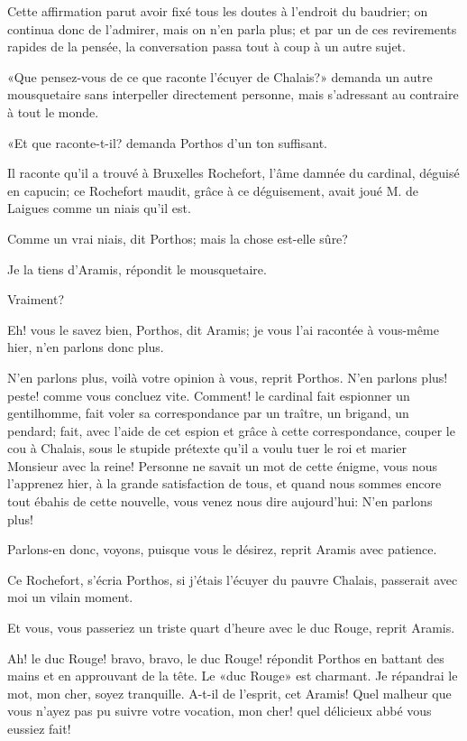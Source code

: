 Cette affirmation parut avoir fixé tous les doutes à l'endroit du baudrier; on continua donc de l'admirer, mais on n'en parla plus; et par un de ces revirements rapides de la pensée, la conversation passa tout à coup à un autre sujet. 

«Que pensez-vous de ce que raconte l'écuyer de Chalais?» demanda un autre mousquetaire sans interpeller directement personne, mais s'adressant au contraire à tout le monde. 

«Et que raconte-t-il? demanda Porthos d'un ton suffisant. 

\speak  Il raconte qu'il a trouvé à Bruxelles Rochefort, l'âme damnée du cardinal, déguisé en capucin; ce Rochefort maudit, grâce à ce déguisement, avait joué M. de Laigues comme un niais qu'il est. 

\speak  Comme un vrai niais, dit Porthos; mais la chose est-elle sûre? 

\speak  Je la tiens d'Aramis, répondit le mousquetaire. 

\speak  Vraiment? 

\speak  Eh! vous le savez bien, Porthos, dit Aramis; je vous l'ai racontée à vous-même hier, n'en parlons donc plus. 

\speak  N'en parlons plus, voilà votre opinion à vous, reprit Porthos. N'en parlons plus! peste! comme vous concluez vite. Comment! le cardinal fait espionner un gentilhomme, fait voler sa correspondance par un traître, un brigand, un pendard; fait, avec l'aide de cet espion et grâce à cette correspondance, couper le cou à Chalais, sous le stupide prétexte qu'il a voulu tuer le roi et marier Monsieur avec la reine! Personne ne savait un mot de cette énigme, vous nous l'apprenez hier, à la grande satisfaction de tous, et quand nous sommes encore tout ébahis de cette nouvelle, vous venez nous dire aujourd'hui: N'en parlons plus! 

\speak  Parlons-en donc, voyons, puisque vous le désirez, reprit Aramis avec patience. 

\speak  Ce Rochefort, s'écria Porthos, si j'étais l'écuyer du pauvre Chalais, passerait avec moi un vilain moment. 

\speak  Et vous, vous passeriez un triste quart d'heure avec le duc Rouge, reprit Aramis. 

\speak  Ah! le duc Rouge! bravo, bravo, le duc Rouge! répondit Porthos en battant des mains et en approuvant de la tête. Le «duc Rouge» est charmant. Je répandrai le mot, mon cher, soyez tranquille. A-t-il de l'esprit, cet Aramis! Quel malheur que vous n'ayez pas pu suivre votre vocation, mon cher! quel délicieux abbé vous eussiez fait! 

